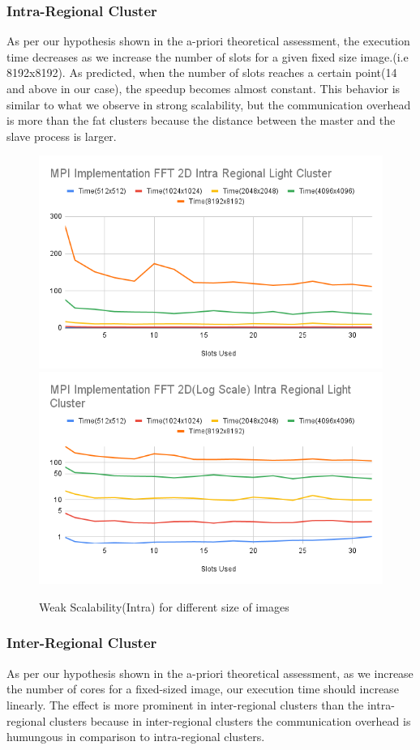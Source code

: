 \documentclass{article}
\begin{document}
\subsubsection{Intra-Regional Cluster}
As per our hypothesis shown in the a-priori theoretical assessment,
the execution time decreases as we increase the number of slots for a given fixed size image.(i.e 8192x8192). As predicted, when the number of slots reaches a certain point(14 and above in our case), the speedup becomes almost constant.
This behavior is similar to what we observe in strong scalability, but the communication overhead is more than the fat clusters  because the distance between the master and the slave process is larger.
\begin{figure}[hb]
    \includegraphics[width=.48\textwidth]{MPI Implementation FFT 2D Intra Regional Light Cluster.png}\hfill
    \includegraphics[width=.48\textwidth]{MPI Implementation FFT 2D(Log Scale) Intra Regional Light Cluster.png}
    \caption{Weak Scalability(Intra) for different size of images}
    \label{fig:Weak Scalability(Intra)}
\end{figure}

\subsubsection{Inter-Regional Cluster}
As per our hypothesis shown in the a-priori theoretical assessment, as we increase the number of cores for a fixed-sized image, our execution time should increase linearly.
The effect is more prominent in inter-regional clusters than the intra-regional clusters because in inter-regional clusters the communication overhead is humungous in comparison to intra-regional clusters.
\end{document}
